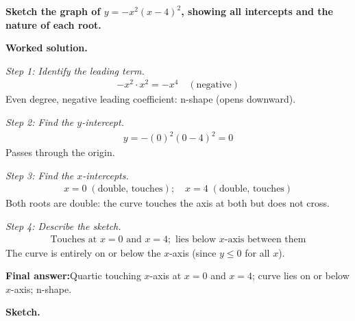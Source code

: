 \documentclass[11pt]{article}
\newcommand{\question}[1]{\par\medskip\noindent\textbf{#1}\par}
\begin{document}
\question{Sketch the graph of \( y = -x^2(x - 4)^2 \), showing all intercepts and the nature of each root.}

\textbf{Worked solution.}

\textit{Step 1: Identify the leading term.}
\[\begin{gathered}
-x^2 \cdot x^2 = -x^4 \quad (\text{negative})
\end{gathered}\]
Even degree, negative leading coefficient: n-shape (opens downward).

\textit{Step 2: Find the \( y \)-intercept.}
\[\begin{gathered}
y = -(0)^2(0-4)^2 = 0
\end{gathered}\]
Passes through the origin.

\textit{Step 3: Find the \( x \)-intercepts.}
\[\begin{gathered}
x = 0 \;(\text{double, touches}); \quad x = 4 \;(\text{double, touches})
\end{gathered}\]
Both roots are double: the curve touches the axis at both but does not cross.

\textit{Step 4: Describe the sketch.}
\[\begin{gathered}
\text{Touches at } x = 0 \text{ and } x = 4; \text{ lies below }x\text{-axis between them}
\end{gathered}\]
The curve is entirely on or below the \( x \)-axis (since \( y \leq 0 \) for all \( x \)).

\begin{answerbox}
\textbf{Final answer:}\quad Quartic touching \(\displaystyle x\)-axis at \(\displaystyle x = 0\) and \(\displaystyle x = 4\); curve lies on or below \(\displaystyle x\)-axis; n-shape.
\end{answerbox}
\textbf{Sketch.}
\end{document}
